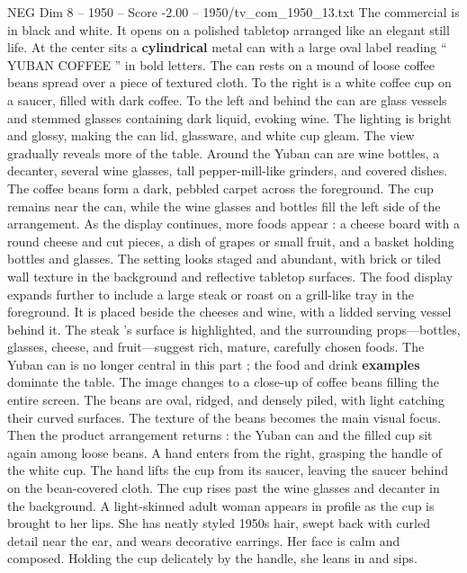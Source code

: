 \begin{textsample}{NEG Dim 8 – 1950 – Score -2.00 – 1950/tv\_com\_1950\_13.txt}  \label{ex:f8_neg_027}
The commercial is in black and white.
It opens on a polished tabletop arranged like an elegant still life.
At the center sits a \textbf{cylindrical} metal can with a large oval label reading “ YUBAN COFFEE ” in bold letters.
The can rests on a mound of loose coffee beans spread over a piece of textured cloth.
To the right is a white coffee cup on a saucer, filled with dark coffee.
To the left and behind the can are glass vessels and stemmed glasses containing dark liquid, evoking wine.
The lighting is bright and glossy, making the can lid, glassware, and white cup gleam.
The view gradually reveals more of the table.
Around the Yuban can are wine bottles, a decanter, several wine glasses, tall pepper-mill-like grinders, and covered dishes.
The coffee beans form a dark, pebbled carpet across the foreground.
The cup remains near the can, while the wine glasses and bottles fill the left side of the arrangement.
As the display continues, more foods appear : a cheese board with a round cheese and cut pieces, a dish of grapes or small fruit, and a basket holding bottles and glasses.
The setting looks staged and abundant, with brick or tiled wall texture in the background and reflective tabletop surfaces.
The food display expands further to include a large steak or roast on a grill-like tray in the foreground.
It is placed beside the cheeses and wine, with a lidded serving vessel behind it.
The steak ’s surface is highlighted, and the surrounding props—bottles, glasses, cheese, and fruit—suggest rich, mature, carefully chosen foods.
The Yuban can is no longer central in this part ; the food and drink \textbf{examples} dominate the table.
The image changes to a close-up of coffee beans filling the entire screen.
The beans are oval, ridged, and densely piled, with light catching their curved surfaces.
The texture of the beans becomes the main visual focus.
Then the product arrangement returns : the Yuban can and the filled cup sit again among loose beans.
A hand enters from the right, grasping the handle of the white cup.
The hand lifts the cup from its saucer, leaving the saucer behind on the bean-covered cloth.
The cup rises past the wine glasses and decanter in the background.
A light-skinned adult woman appears in profile as the cup is brought to her lips.
She has neatly styled 1950s hair, swept back with curled detail near the ear, and wears decorative earrings.
Her face is calm and composed.
Holding the cup delicately by the handle, she leans in and sips.

\end{textsample}
